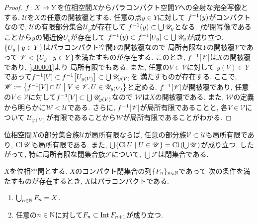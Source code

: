\documentclass[uplatex, dvipdfmx, a4paper, 12pt, class=jsbook, crop=false]{standalone}
\begin{document}
\begin{proof}
	$ f\colon X\to Y $を位相空間$ X $からパラコンパクト空間$ Y $への全射な完全写像とする.
	$ \mathscr{U} $を$ X $の任意の開被覆とする. 任意の点$ y \in Y $に対して
	$ \mapinvpt{f}{y} $がコンパクトなので, $ \mathscr{U} $の有限部分集合$ \mathscr{U}_y $が存在して
	$ \mapinvpt{f}{y} \subset \bigcup \mathscr{U}_y $となる.
	$ f $が閉写像であることから$ y $の開近傍$ U_y $が存在して
	$ \mapinvpt{f}{y}\subset \mapinvset{f}{U_y} \subset \bigcup \mathscr{U}_y $が成り立つ.
	$ \setcomp{U_y}{y \in Y} $はパラコンパクト空間$ Y $の開被覆なので
	局所有限な$ Y $の開被覆$ \mathscr{V} $であって
	$ \mathscr{V} < \setcomp{U_y}{y \in Y} $を満たすものが存在する.
	このとき, $ \mapinvset{f}{\mathscr{V}} $は$ X $の開被覆であり, \cref{p00001}より
	局所有限でもある. また, 任意の$ V \in \mathscr{V} $に対して
	$ y(V) \in Y $であって$ \mapinvset{f}{V} \subset \mapinvset{f}{U_{y(V)}} \subset \bigcup \mathscr{U}_{y(V)} $を
	満たすものが存在する.
	ここで, $ \mathscr{W} \defeq \setcomp{\mapinvset{f}{V} \cap U}{V \in \mathscr{V}, U \in \mathscr{U}_{y(V)}} $と定める.
	$ \mapinvset{f}{\mathscr{V}} $が開被覆であり,
	任意の$ V \in \mathscr{V} $に対して$ \mapinvset{f}{V} \subset \bigcup \mathscr{U}_{y(V)} $なので
	$ \mathscr{W} $は$ X $の開被覆である.
	また, $ \mathscr{W} $の定義から明らかに$ \mathscr{W} < \mathscr{U} $である.
	さらに, $ \mapinvset{f}{\mathscr{V}} $が局所有限であることと, 各$ V \in \mathscr{V} $について
	$ \mathscr{U}_{y(V)} $が有限であることから$ \mathscr{W} $が局所有限であることがわかる.
\end{proof}

\begin{proposition}
	\label{lem:every closure of any locally finite family of subsets is locally finite}
	位相空間$ X $の部分集合族$ \mathscr{U} $が局所有限ならば,
	任意の部分族$ \mathscr{V} \subset \mathscr{U} $も局所有限であり,
	$ \mathop{\mathrm{Cl}}\nolimits \mathscr{U} $も局所有限である.
	また, $ \bigcup \setcomp{\topcl U}{U \in \mathscr{U}} = \topcl \left(\bigcup \mathscr{U}\right)$が成り立つ.
	したがって, 特に局所有限な閉集合族$ \mathscr{F} $について,
	$ \bigcup \mathscr{F} $は閉集合である.
\end{proposition}

\begin{proposition}
	\label{prop:characterization of paracompactness by a family of compact closed sets}
	$ X $を位相空間とする. $ X $のコンパクト閉集合の列$ \{F_n\}_{n \in \mathbb{N}} $であって
	次の条件を満たすものが存在するとき, $ X $はパラコンパクトである.
	\begin{enumerate}
		\item $ \bigcup_{n \in \mathbb{N}} F_n = X $.
		\item 任意の$ n \in \mathbb{N} $に対して$ F_n \subset \mathop{\mathrm{Int}}\nolimits F_{n+1} $が成り立つ.
	\end{enumerate}
\end{proposition}
\end{document}
